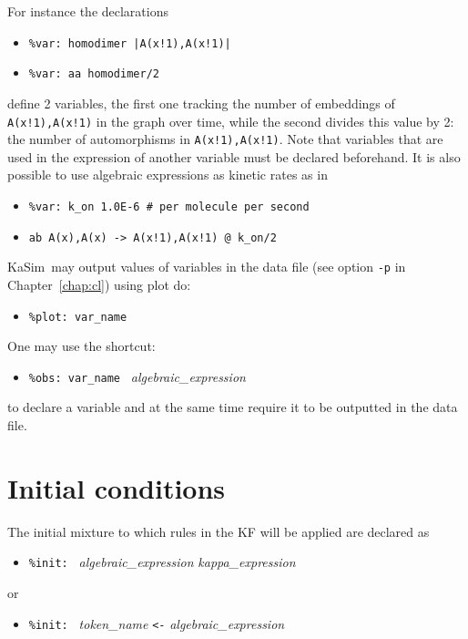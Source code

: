 \documentclass[11pt]{book}
\def\KaSim{\textsf{KaSim}}
\def\ttt#1{\texttt{#1}}
\def\var#1{{\textquotesingle}#1{\textquotesingle}}
\def\noi{\noindent}
\def\ITE#1{\begin{itemize}#1\end{itemize}}
\begin{document}
\noi For instance the declarations
\ITE{
\item[] \ttt{\%var: \var{homodimer}~|A(x!1),A(x!1)|}
\item[] \ttt{\%var: \var{aa}~\var{homodimer}/2}
}
define 2 variables, the first one tracking the number of embeddings of \ttt{A(x!1),A(x!1)} in the graph over time, while the second divides this value by 2: the number of automorphisms in \ttt{A(x!1),A(x!1)}. Note that variables that are used in the expression of another variable must be declared beforehand. 
\vskip 0.25cm
\noi It is also possible to use algebraic expressions as kinetic rates as in
\ITE{
\item[] \ttt{\%var: \var{k\_on}~1.0E-6 \# per molecule per second}
\item[] \ttt{\var{ab}~A(x),A(x) -> A(x!1),A(x!1) @ \var{k\_on}/2}
}
\KaSim~may output values of variables in the data file (see option \ttt{-p} in Chapter~\ref{chap:cl}) using plot do:
\ITE{
\item[] \ttt{\%plot: {\textquotesingle}var\_name{\textquotesingle}}
}
One may use the shortcut: 
\ITE{
\item[] \ttt{\%obs: {\textquotesingle}var\_name{\textquotesingle} } \textit{algebraic\_expression}}
to declare a variable and at the same time require it to be outputted in the data file. 

\section{Initial conditions}\label{sec:init}

The initial mixture to which rules in the KF will be applied are declared as
\ITE{
\item[] \ttt{\%init: } \textit{algebraic\_expression} \textit{kappa\_expression}
}
or
\ITE{
\item[] \ttt{\%init: }  \textit{token\_name} \ttt{<-} \textit{algebraic\_expression}
}
\end{document}
